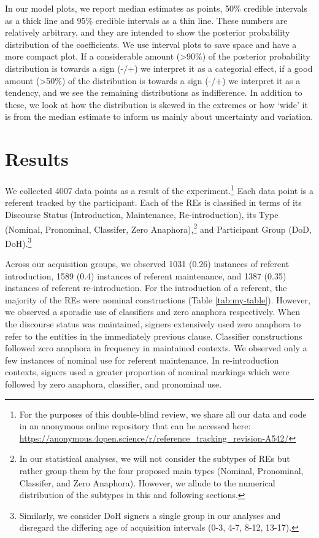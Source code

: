 \documentclass[]{elsarticle} %
\begin{document}
In our model plots, we report median estimates as points, 50\% credible
intervals as a thick line and 95\% credible intervals as a thin line.
These numbers are relatively arbitrary, and they are intended to show
the posterior probability distribution of the coefficients. We use
interval plots to save space and have a more compact plot. If a
considerable amount (\textgreater90\%) of the posterior probability
distribution is towards a sign (-/+) we interpret it as a categorial
effect, if a good amount (\textgreater50\%) of the distribution is
towards a sign (-/+) we interpret it as a tendency, and we see the
remaining distributions as indifference. In addition to these, we look
at how the distribution is skewed in the extremes or how `wide' it is
from the median estimate to inform us mainly about uncertainty and
variation.

\hypertarget{results}{%
\section{Results}\label{results}}

We collected 4007 data points as a result of the
experiment.\footnote{For the purposes of this double-blind review, we share all our data and code in an anonymous online repository that can be accessed here: \url{https://anonymous.4open.science/r/reference_tracking_revision-A542/}}
Each data point is a referent tracked by the participant. Each of the
REs is classified in terms of its Discourse Status (Introduction,
Maintenance, Re-introduction), its Type (Nominal, Pronominal, Classifer,
Zero
Anaphora),\footnote{In our statistical analyses, we will not consider the subtypes of REs but rather group them by the four proposed main types (Nominal, Pronominal, Classifer, and Zero Anaphora). However, we allude to the numerical distribution of the subtypes in this and following sections.}
and Participant Group (DoD,
DoH).\footnote{Similarly, we consider DoH signers a single group in our analyses and disregard the differing age of acquisition intervals (0-3, 4-7, 8-12, 13-17).}

Across our acquisition groups, we observed 1031 (0.26) instances of
referent introduction, 1589 (0.4) instances of referent maintenance, and
1387 (0.35) instances of referent re-introduction. For the introduction
of a referent, the majority of the REs were nominal constructions (Table
\ref{tab:my-table}). However, we observed a sporadic use of classifiers
and zero anaphora respectively. When the discourse status was
maintained, signers extensively used zero anaphora to refer to the
entities in the immediately previous clause. Classifier constructions
followed zero anaphora in frequency in maintained contexts. We observed
only a few instances of nominal use for referent maintenance. In
re-introduction contexts, signers used a greater proportion of nominal
markings which were followed by zero anaphora, classifier, and
pronominal use.
\end{document}
